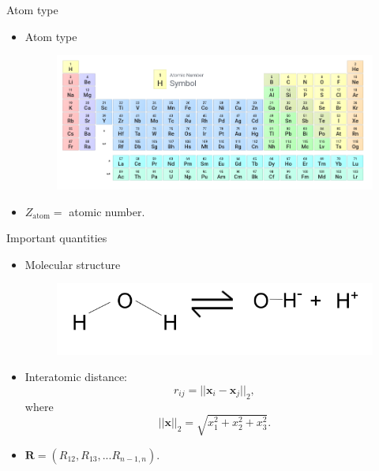 \documentclass{beamer}
\begin{document}
\begin{frame}{Atom type}
    \begin{itemize}
        \item Atom type
        \begin{figure}[htbp]
            \centering
            \includegraphics[scale=0.3]{img/slide/periodic_table.png}
            \label{fig:h2o}
        \end{figure}
        \item $Z_\text{atom} = $ atomic number.
    \end{itemize}
\end{frame}

\begin{frame}{Important quantities}
    \begin{itemize}
        \item Molecular structure
        \begin{figure}[htbp]
            \centering
            \includegraphics[scale=0.3]{img/slide/molecular_structure.png}
            \label{fig:h2o}
        \end{figure}
        \item Interatomic distance:
        \begin{equation}
            r_{ij} = ||\mathbf{x}_i - \mathbf{x}_j||_2,
        \end{equation}
        where
        \begin{equation}
            ||\mathbf{x}||_2 = \sqrt{x_1^2 + x_2^2 + x_3^2}.
        \end{equation}
        \item $\mathbf{R} = (R_{12}, R_{13},...R_{n-1,n})$.
    \end{itemize}
\end{frame}
\end{document}
